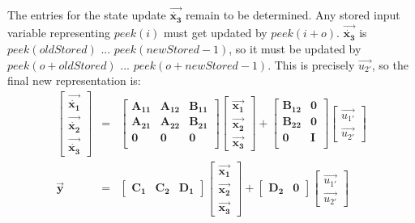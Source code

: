     The entries for the state update $\vec{\dot{\mathbf{x_3}}}$ remain to be
determined. Any stored input variable representing $peek(i)$ must
get updated by $peek(i+o)$. $\vec{\dot{\mathbf{x_3}}}$ is
$peek(oldStored)$ ... $peek(newStored-1)$, so it must be updated
by $peek(o+oldStored)$ ... $peek(o+newStored-1)$. This is
precisely $\vec{u_{2'}}$, so the final new representation is:
\begin{eqnarray*}
\left [ \begin{array} {c} \vec{\dot{\mathbf{x_1}}} \\ \vec{\dot{\mathbf{x_2}}} \\
\vec{\dot{\mathbf{x_3}}}
\end{array} \right ] & = & \left [ \begin{array} {ccc} \mathbf{A_{11}} &
\mathbf{A_{12}} & \mathbf{B_{11}} \\ \mathbf{A_{21}} &
\mathbf{A_{22}} & \mathbf{B_{21}} \\ \mathbf{0} & \mathbf{0} & \mathbf{0} \\
\end{array} \right ] \left [ \begin{array} {c} \vec{\mathbf{x_1}} \\ \vec{\mathbf{x_2}} \\
\vec{\mathbf{x_3}} \end{array} \right ] + \left [ \begin{array}
{cc} \mathbf{B_{12}} & \mathbf{0} \\ \mathbf{B_{22}} & \mathbf{0} \\ \mathbf{0} & \mathbf{I} \\
\end{array} \right ] \left[ \begin{array} {c} \vec{u_{1'}} \\ \vec{u_{2'}} \end{array} \right ] \\
\vec{\mathbf{y}} & = & \left [ \begin{array} {ccc} \mathbf{C_1} &
\mathbf{C_2} & \mathbf{D_1} \end{array} \right ] \left [
\begin{array} {c} \vec{\mathbf{x_1}} \\ \vec{\mathbf{x_2}} \\ \vec{\mathbf{x_3}} \end{array} \right ] +
\left [ \begin{array} {cc} \mathbf{D_2} & \mathbf{0}
\end{array} \right ] \left [ \begin{array} {c} \vec{u_{1'}} \\
\vec{u_{2'}} \end{array} \right ]
\end{eqnarray*}

